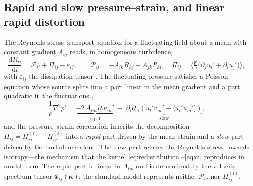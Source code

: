 \documentclass[lineno]{JFM-FLM_Au}
\begin{document}
\subsection{Rapid and slow pressure--strain, and linear rapid
distortion}\label{sec:rapid-slow}

The Reynolds-stress transport equation for a fluctuating field about a
mean with constant gradient $A_{ij}$ reads, in homogeneous turbulence,
\begin{equation}
  \frac{\mathrm{d}R_{ij}}{\mathrm{d}t}
  = \mathcal{P}_{ij} + \Pi_{ij} - \varepsilon_{ij},
  \qquad
  \mathcal{P}_{ij}=-A_{ik}R_{kj}-A_{jk}R_{ki},
  \quad
  \Pi_{ij}=\Big\langle \tfrac{p'}{\rho}
            \big(\partial_j u_i'+\partial_i u_j'\big)\Big\rangle,
  \label{eq:rstransport}
\end{equation}
with $\varepsilon_{ij}$ the dissipation tensor \citep{Pope2000}. The
fluctuating pressure satisfies a Poisson equation whose source splits
into a part linear in the mean gradient and a part quadratic in the
fluctuations \citep{Pope2000},
\begin{equation}
  \frac{1}{\rho}\nabla^2 p'
  = \underbrace{-2\,A_{lm}\,\partial_l u_m'}_{\text{rapid}}
    \;-\;
    \underbrace{\partial_l\partial_m\!\left(u_l' u_m'
     -\langle u_l' u_m'\rangle\right)}_{\text{slow}} ,
  \label{eq:poisson}
\end{equation}
and the pressure--strain correlation inherits the decomposition
$\Pi_{ij}=\Pi^{(\mathrm r)}_{ij}+\Pi^{(\mathrm s)}_{ij}$ into a
\emph{rapid} part driven by the mean strain and a \emph{slow} part driven
by the turbulence alone. The slow part relaxes the Reynolds stress
towards isotropy---the mechanism that the kernel
\eqref{eq:redistribution}--\eqref{eq:ci} reproduces in model form. The
rapid part is linear in $A_{lm}$ and is determined by the velocity
spectrum tensor $\Phi_{ij}(\boldsymbol{\kappa})$; the standard model
represents neither $\mathcal{P}_{ij}$ nor $\Pi^{(\mathrm r)}_{ij}$.
\end{document}

